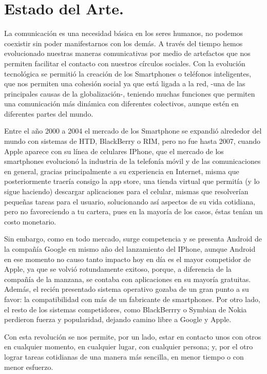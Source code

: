 \section{Estado del Arte.}

\noindent
La comunicación es una necesidad básica en los seres humanos, no podemos coexistir sin poder manifestarnos con los demás. A través del tiempo hemos evolucionado nuestras maneras comunicativas por medio de artefactos que nos permiten facilitar el contacto con nuestros círculos sociales. Con la evolución tecnológica se permitió la creación de los Smartphones o teléfonos inteligentes, que nos permiten una cohesión social ya que está ligada a la red, -una de las principales causas de la globalización-, teniendo muchas funciones que permiten una comunicación más dinámica con diferentes colectivos, aunque estén en diferentes partes del mundo.

\noindent
\newline
Entre el año 2000 a 2004 el mercado de los Smartphone se expandió alrededor del mundo con sistemas de HTD, BlackBerry o RIM, pero no fue hasta 2007, cuando Apple aparece con su línea de celulares IPhone, que el mercado de los smartphones evolucionó la industria de la telefonía móvil y de las comunicaciones en general, gracias principalmente a su experiencia en Internet, misma que posteriormente traería consigo la app store, una tienda virtual que permitía (y lo sigue haciendo) descargar aplicaciones para el celular, mismas que resolverían pequeñas tareas para el usuario, solucionando así aspectos de su vida cotidiana, pero no favoreciendo a tu cartera, pues en la mayoría de los casos, éstas tenían un costo monetario. 

\noindent
Sin embargo, como en todo mercado, surge competencia y se presenta Android de la compañía Google en mismo año del lanzamiento del IPhone, aunque Android en ese momento no causo tanto impacto hoy en día es el mayor competidor de Apple, ya que se volvió rotundamente exitoso, porque, a diferencia de la compañía de la manzana, se contaba con aplicaciones en su mayoría gratuitas. Además, el recién presentado sistema operativo gozaba de un gran punto a su favor: la compatibilidad con más de un fabricante de smartphones. 
Por otro lado, el resto de los sistemas competidores, como BlackBerrry o Symbian de Nokia perdieron fuerza y popularidad, dejando camino libre a Google y Apple.

\noindent
\newline
Con esta revolución se nos permite, por un lado, estar en contacto unos con otros en cualquier momento, en cualquier lugar, con cualquier persona; y, por el otro lograr tareas cotidianas de una manera más sencilla, en menor tiempo o con menor esfuerzo. \cite{Conexion}

